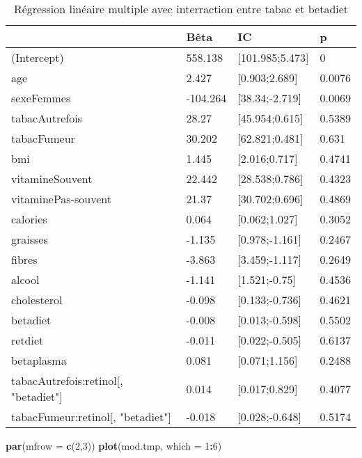 \documentclass[]{article}
\newenvironment{Shaded}{\begin{snugshade}}{\end{snugshade}}
\newcommand{\KeywordTok}[1]{\textcolor[rgb]{0.13,0.29,0.53}{\textbf{#1}}}
\newcommand{\DataTypeTok}[1]{\textcolor[rgb]{0.13,0.29,0.53}{#1}}
\newcommand{\DecValTok}[1]{\textcolor[rgb]{0.00,0.00,0.81}{#1}}
\newcommand{\OperatorTok}[1]{\textcolor[rgb]{0.81,0.36,0.00}{\textbf{#1}}}
\newcommand{\NormalTok}[1]{#1}
\begin{document}
\begin{table}

\caption{\label{tab:unnamed-chunk-71}Régression linéaire multiple avec interraction entre tabac et betadiet}
\centering
\begin{tabular}[t]{l|l|l|l}
\hline
  & Bêta & IC & p\\
\hline
\rowcolor[HTML]{BBD2E1}  (Intercept) & 558.138 & [101.985;5.473] & 0\\
\hline
age & 2.427 & [0.903;2.689] & 0.0076\\
\hline
\rowcolor[HTML]{BBD2E1}  sexeFemmes & -104.264 & [38.34;-2.719] & 0.0069\\
\hline
tabacAutrefois & 28.27 & [45.954;0.615] & 0.5389\\
\hline
\rowcolor[HTML]{BBD2E1}  tabacFumeur & 30.202 & [62.821;0.481] & 0.631\\
\hline
bmi & 1.445 & [2.016;0.717] & 0.4741\\
\hline
\rowcolor[HTML]{BBD2E1}  vitamineSouvent & 22.442 & [28.538;0.786] & 0.4323\\
\hline
vitaminePas-souvent & 21.37 & [30.702;0.696] & 0.4869\\
\hline
\rowcolor[HTML]{BBD2E1}  calories & 0.064 & [0.062;1.027] & 0.3052\\
\hline
graisses & -1.135 & [0.978;-1.161] & 0.2467\\
\hline
\rowcolor[HTML]{BBD2E1}  fibres & -3.863 & [3.459;-1.117] & 0.2649\\
\hline
alcool & -1.141 & [1.521;-0.75] & 0.4536\\
\hline
\rowcolor[HTML]{BBD2E1}  cholesterol & -0.098 & [0.133;-0.736] & 0.4621\\
\hline
betadiet & -0.008 & [0.013;-0.598] & 0.5502\\
\hline
\rowcolor[HTML]{BBD2E1}  retdiet & -0.011 & [0.022;-0.505] & 0.6137\\
\hline
betaplasma & 0.081 & [0.071;1.156] & 0.2488\\
\hline
\rowcolor[HTML]{BBD2E1}  tabacAutrefois:retinol[, "betadiet"] & 0.014 & [0.017;0.829] & 0.4077\\
\hline
tabacFumeur:retinol[, "betadiet"] & -0.018 & [0.028;-0.648] & 0.5174\\
\hline
\end{tabular}
\end{table}

\begin{Shaded}
\begin{Highlighting}[]
\KeywordTok{par}\NormalTok{(}\DataTypeTok{mfrow =} \KeywordTok{c}\NormalTok{(}\DecValTok{2}\NormalTok{,}\DecValTok{3}\NormalTok{))}
\KeywordTok{plot}\NormalTok{(mod.tmp, }\DataTypeTok{which =} \DecValTok{1}\OperatorTok{:}\DecValTok{6}\NormalTok{)}
\end{Highlighting}
\end{Shaded}
\end{document}
